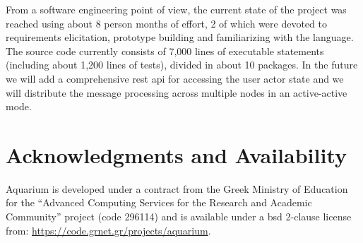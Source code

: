 \documentclass[letterpaper,twocolumn,10pt]{article}
\begin{document}
From a software engineering point of view, the current state of the
project was reached using about 8 person months of effort, 2 of which
were devoted to requirements elicitation, prototype building and
familiarizing with the language. The source code currently consists of
7,000 lines of executable statements (including about 1,200 lines of
tests), divided in about 10 packages. In the future we will add a
comprehensive {\sc rest api} for accessing the user actor state and we
will distribute the message processing across multiple nodes in an
active-active mode.

\section{Acknowledgments and Availability}

Aquarium is developed under a contract from the Greek Ministry of
Education for the ``Advanced Computing Services for the Research and
Academic Community'' project (code 296114) and is available under a {\sc bsd}
2-clause license from: \url{https://code.grnet.gr/projects/aquarium}.

{\footnotesize 
}
\end{document}
